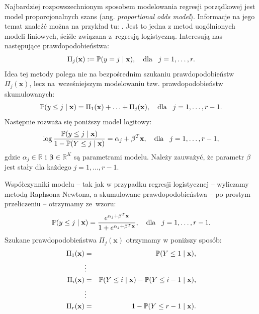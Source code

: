 \documentclass{mini}
\begin{document}
Najbardziej rozpowszechnionym sposobem modelowania regresji porządkowej jest model proporcjonalnych szans (ang. \textit{proportional odds model}). Informacje na jego temat znaleźć można na przykład tu: \cite{pom}. Jest to jedna z metod uogólnionych modeli liniowych, ściśle związana z~regresją logistyczną. Interesują nas następujące prawdopodobieństwa: 
$$
\Pi_j(\mathbf{x}):=\mathbb{P}(y=j\hspace{1mm}|\hspace{1mm}\mathbf{x}),\quad \textrm{dla}\hspace{3mm} j=1,\ldots,r.
$$
Idea tej metody polega nie na bezpośrednim szukaniu prawdopodobieństw $\Pi_j(\mathbf{x})$, lecz na~wcześniejszym modelowaniu tzw. prawdopodobieństw skumulowanych:
$$
\mathbb{P}(y\leq j \hspace{1mm}|\hspace{1mm} \mathbf{x})=\Pi_1(\mathbf{x})+\ldots+\Pi_j(\mathbf{x}),\quad \textrm{dla}\hspace{3mm} j=1,\ldots,r-1.
$$
Następnie rozważa się poniższy model logitowy:
$$
\log\dfrac{\mathbb{P}(y\leq j \hspace{1mm}|\hspace{1mm} \mathbf{x})}{1 - \mathbb{P}(Y\leq j \hspace{1mm}|\hspace{1mm} \mathbf{x})} = \alpha_j+\mathbf{\beta}^T\mathbf{x},\quad \textrm{dla}\hspace{3mm} j=1,\ldots,r-1,
$$
gdzie $\alpha_j\in \mathbb{R}$ i $\mathbf{\beta}\in \mathbb{R}^K$ są parametrami modelu. Należy zauważyć, że parametr $\beta$ jest stały dla każdego $j=1, \ldots, r-1$.

Współczynniki modelu -- tak jak w przypadku regresji logistycznej -- wyliczamy metodą Raphsona-Newtona, a skumulowane prawdopodobieństwa -- po prostym przeliczeniu -- otrzymamy ze~wzoru:
$$
\mathbb{P}(y\leq j \hspace{1mm}|\hspace{1mm} \mathbf{x})=\dfrac{e^{\alpha_j+\mathbf{\beta}^T\mathbf{x}}}{1+e^{\alpha_j+\mathbf{\beta}^T\mathbf{x}}},\quad \textrm{dla}\hspace{3mm} j=1,\ldots,r-1.
$$ 
Szukane prawdopodobieństwa $\Pi_j(\mathbf{x})$ otrzymamy w poniższy sposób:
\begin{eqnarray*}
\Pi_1(\mathbf{x}) &=& \mathbb{P}(Y\leq 1 \hspace{1mm}|\hspace{1mm}\mathbf{x}),\\
&\vdots&\\
\Pi_i(\mathbf{x}) &=& \mathbb{P}(Y\leq i \hspace{1mm}|\hspace{1mm} \mathbf{x}) - \mathbb{P}(Y\leq i-1 \hspace{1mm}|\hspace{1mm} \mathbf{x}),\\
&\vdots&\\
\Pi_r(\mathbf{x}) &=& 1 - \mathbb{P}(Y\leq r-1 \hspace{1mm}|\hspace{1mm} \mathbf{x}).
\end{eqnarray*}
\end{document}
